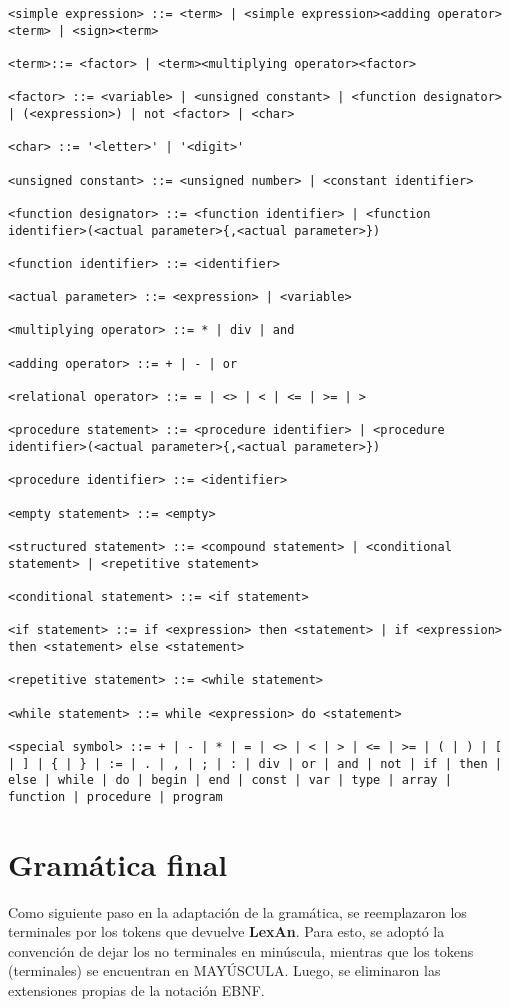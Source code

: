 \documentclass[a4paper,oneside]{report}
\begin{document}
\begin{verbatim}
<simple expression> ::= <term> | <simple expression><adding operator><term> | <sign><term>

<term>::= <factor> | <term><multiplying operator><factor>

<factor> ::= <variable> | <unsigned constant> | <function designator> | (<expression>) | not <factor> | <char>

<char> ::= '<letter>' | '<digit>'

<unsigned constant> ::= <unsigned number> | <constant identifier>

<function designator> ::= <function identifier> | <function identifier>(<actual parameter>{,<actual parameter>})

<function identifier> ::= <identifier>

<actual parameter> ::= <expression> | <variable>

<multiplying operator> ::= * | div | and

<adding operator> ::= + | - | or

<relational operator> ::= = | <> | < | <= | >= | >

<procedure statement> ::= <procedure identifier> | <procedure identifier>(<actual parameter>{,<actual parameter>})

<procedure identifier> ::= <identifier>

<empty statement> ::= <empty>

<structured statement> ::= <compound statement> | <conditional statement> | <repetitive statement>

<conditional statement> ::= <if statement>

<if statement> ::= if <expression> then <statement> | if <expression> then <statement> else <statement>

<repetitive statement> ::= <while statement>

<while statement> ::= while <expression> do <statement>

<special symbol> ::= + | - | * | = | <> | < | > | <= | >= | ( | ) | [ | ] | { | } | := | . | , | ; | : | div | or | and | not | if | then | else | while | do | begin | end | const | var | type | array | function | procedure | program

\end{verbatim}

\section{Gramática final}

Como siguiente paso en la adaptación de la gramática, se reemplazaron los terminales por los tokens que devuelve \textbf{LexAn}. Para esto, se adoptó la convención de dejar los no terminales en minúscula, mientras que los tokens (terminales) se encuentran en MAYÚSCULA. Luego, se eliminaron las extensiones propias de la notación EBNF.
\end{document}
